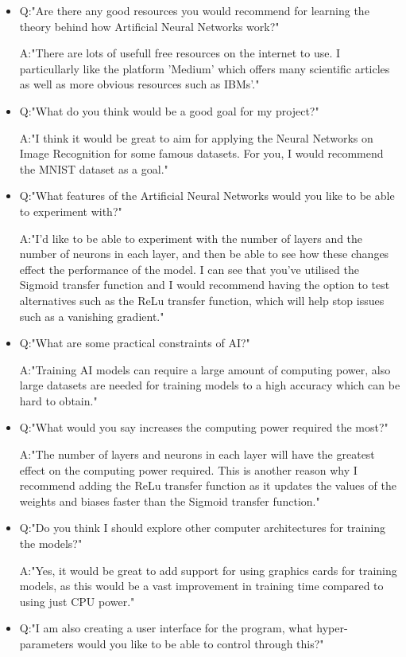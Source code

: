 \documentclass[./project-report/src/latex/project-report.tex]{subfiles}
\begin{document}
\begin{itemize}
    \item Q:"Are there any good resources you would recommend for learning the theory behind how Artificial Neural Networks work?"
    
          A:"There are lots of usefull free resources on the internet to use. I particullarly like the platform 'Medium' which offers many scientific articles 
             as well as more obvious resources such as IBMs'."
    \item Q:"What do you think would be a good goal for my project?"

          A:"I think it would be great to aim for applying the Neural Networks on Image Recognition for some famous datasets. For you, I would recommend 
             the MNIST dataset as a goal."
    \item Q:"What features of the Artificial Neural Networks would you like to be able to experiment with?"

          A:"I'd like to be able to experiment with the number of layers and the number of neurons in each layer, and then be able to see how these changes effect 
             the performance of the model. I can see that you've utilised the Sigmoid transfer function and I would recommend having the option to test alternatives 
              such as the ReLu transfer function, which will help stop issues such as a vanishing gradient."
    \item Q:"What are some practical constraints of AI?"

          A:"Training AI models can require a large amount of computing power, also large datasets are needed for training models to a high accuracy which can be hard 
             to obtain."
    \item Q:"What would you say increases the computing power required the most?"

          A:"The number of layers and neurons in each layer will have the greatest effect on the computing power required. This is another reason why I recommend adding 
             the ReLu transfer function as it updates the values of the weights and biases faster than the Sigmoid transfer function."
    \item Q:"Do you think I should explore other computer architectures for training the models?"

          A:"Yes, it would be great to add support for using graphics cards for training models, as this would be a vast improvement in training time compared to using 
             just CPU power."
    \item Q:"I am also creating a user interface for the program, what hyper-parameters would you like to be able to control through this?"


\end{itemize}
\end{document}
